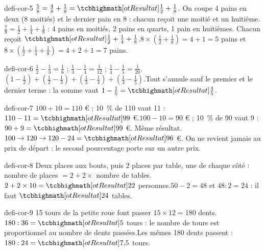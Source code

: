 \begin{blocEdition}{defi-cor-5}
$\frac58=\frac48+\frac18=\res{\frac12+\frac18}$. On coupe 4 pains en deux (8 moitiés) et le dernier pain en 8 : chacun reçoit une moitié et un huitième.$\frac78=\frac12+\frac14+\frac18$ : 4 pains en moitiés, 2 pains en quarts, 1 pain en huitièmes. Chacun reçoit $\res{\frac12+\frac14+\frac18}$.$8\times\left(\frac12+\frac18\right)=4+1=5$ pains et $8\times\left(\frac12+\frac14+\frac18\right)=4+2+1=7$ pains.
\end{blocEdition}
\begin{blocEdition}{defi-cor-6}
$\frac12-\frac13=\frac16$ ; $\frac13-\frac14=\frac1{12}$ ; $\frac14-\frac15=\frac1{20}$.$\left(1-\frac12\right)+\left(\frac12-\frac13\right)+\left(\frac13-\frac14\right)+\left(\frac14-\frac15\right)$.Tout s’annule sauf le premier et le dernier terme : la somme vaut $1-\frac15=\res{\frac45}$.
\end{blocEdition}
\begin{blocEdition}{defi-cor-7}
$100+10=110$ € ; 10~\% de 110 vaut 11 : $110-11=\res{99}$ €.$100-10=90$ € ; 10~\% de 90 vaut 9 : $90+9=\res{99}$ €. Même résultat.$100\to120\to120-24=\res{96}$ €. On ne revient jamais au prix de départ : le second pourcentage porte sur un autre prix.
\end{blocEdition}
\begin{blocEdition}{defi-cor-8}
Deux places aux bouts, puis 2 places par table, une de chaque côté : nombre de places $=2+2\times$ nombre de tables.$2+2\times10=\res{22}$ personnes.$50-2=48$ et $48:2=24$ : il faut $\res{24}$ tables.
\end{blocEdition}
\begin{blocEdition}{defi-cor-9}
15 tours de la petite roue font passer $15\times12=180$ dents.$180:36=\res5$ tours : le nombre de tours est proportionnel au nombre de dents passées.Les mêmes 180 dents passent : $180:24=\res{7{,}5}$ tours.
\end{blocEdition}
